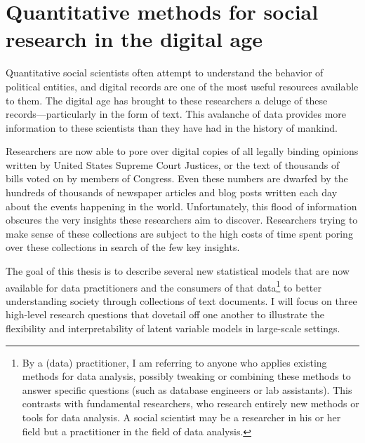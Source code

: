 \chapter{Quantitative methods for social research in the digital age}

Quantitative social scientists often attempt to understand the
behavior of political entities, and digital records are one of the
most useful resources available to them.  The digital age has brought
to these researchers a deluge of these records---particularly in the
form of text.  This avalanche of data provides more information to
these scientists than they have had in the history of mankind.

Researchers are now able to pore over digital copies of all legally
binding opinions written by United States Supreme Court Justices, or
the text of thousands of bills voted on by members of Congress.  Even
these numbers are dwarfed by the hundreds of thousands of newspaper
articles and blog posts written each day about the events happening in
the world.  Unfortunately, this flood of information obscures the very
insights these researchers aim to discover.  Researchers trying to
make sense of these collections are subject to the high costs of time
spent poring over these collections in search of the few key insights.

The goal of this thesis is to describe several new statistical models
that are now available for data practitioners and the consumers of that
data\footnote{By a (data) practitioner, I am referring to anyone who
  applies existing methods for data analysis, possibly tweaking or
  combining these methods to answer specific questions (such as
  database engineers or lab assistants). This contrasts with
  fundamental researchers, who research entirely new methods or tools
  for data analysis.  A social scientist may be a researcher
  in his or her field but a practitioner in the field of data
  analysis.} to better understanding society through collections of
text documents.  I will focus on three high-level research questions
that dovetail off one another to illustrate the flexibility and
interpretability of latent variable models in large-scale settings.

